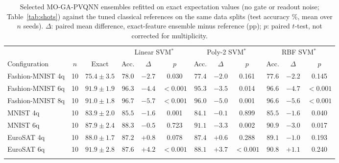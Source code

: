 \begin{table}[t]
\caption{Selected MO-GA-PVQNN ensembles refitted on exact expectation values (no gate or readout noise; Table~\ref{tab:shots}) against the tuned classical references on the same data splits (test accuracy \%, mean over $n$ seeds). $\Delta$: paired mean difference, exact-feature ensemble minus reference (pp); $p$: paired $t$-test, not corrected for multiplicity.}\label{tab:exact-classical}
\footnotesize\setlength\tabcolsep{3pt}
\begin{tabular}{@{}lccccccccccc@{}}
\toprule
 & & & \multicolumn{3}{c}{Linear SVM$^\ast$} & \multicolumn{3}{c}{Poly-2 SVM$^\ast$} & \multicolumn{3}{c}{RBF SVM$^\ast$} \\
Configuration & $n$ & Exact & Acc. & $\Delta$ & $p$ & Acc. & $\Delta$ & $p$ & Acc. & $\Delta$ & $p$ \\
\midrule
Fashion-MNIST 4q & 10 & $75.4\pm3.5$ & $78.0$ & $-2.7$ & 0.030 & $77.4$ & $-2.0$ & 0.161 & $77.6$ & $-2.2$ & 0.145 \\
Fashion-MNIST 6q & 10 & $91.9\pm1.9$ & $96.3$ & $-4.4$ & $<0.001$ & $95.3$ & $-3.5$ & 0.014 & $96.6$ & $-4.7$ & $<0.001$ \\
Fashion-MNIST 8q & 10 & $91.0\pm1.8$ & $96.7$ & $-5.7$ & $<0.001$ & $96.0$ & $-5.0$ & 0.001 & $96.6$ & $-5.6$ & $<0.001$ \\
MNIST 4q & 10 & $83.9\pm2.0$ & $85.5$ & $-1.6$ & 0.001 & $84.1$ & $-0.1$ & 0.899 & $85.5$ & $-1.6$ & 0.040 \\
MNIST 6q & 10 & $87.9\pm2.4$ & $88.3$ & $-0.5$ & 0.723 & $91.1$ & $-3.3$ & 0.002 & $90.9$ & $-3.0$ & 0.017 \\
EuroSAT 4q & 10 & $88.0\pm1.7$ & $87.2$ & $+0.8$ & 0.078 & $87.4$ & $+0.6$ & 0.288 & $89.1$ & $-1.0$ & 0.193 \\
EuroSAT 6q & 10 & $91.9\pm2.8$ & $87.6$ & $+4.2$ & $<0.001$ & $88.1$ & $+3.7$ & $<0.001$ & $90.8$ & $+1.1$ & 0.240 \\
\botrule
\end{tabular}
\end{table}
